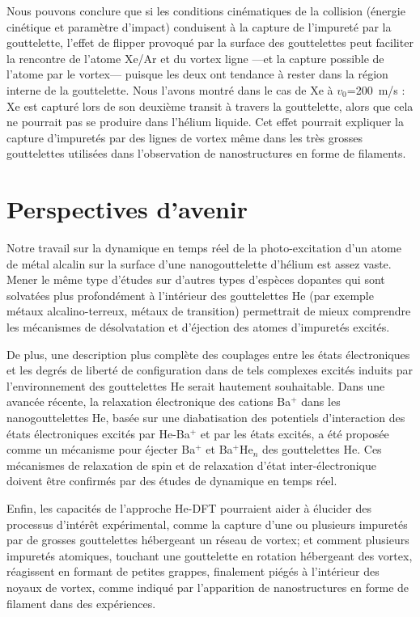 Nous pouvons conclure que si les conditions cinématiques de la collision (énergie cinétique et paramètre d'impact) conduisent à la capture de l'impureté par la gouttelette, l'effet de flipper provoqué par la surface des gouttelettes peut faciliter la rencontre de l'atome Xe/Ar et du vortex ligne ---et la capture possible de l'atome par le vortex--- puisque les deux ont tendance à rester dans la région interne de la gouttelette. Nous l'avons montré dans le cas de Xe à $v_0$=200~m/s : Xe est capturé lors de son deuxième transit à travers la gouttelette, alors que cela ne pourrait pas se produire dans l'hélium liquide\citep{Psh16}. Cet effet pourrait expliquer la capture d'impuretés par des lignes de vortex même dans les très grosses gouttelettes utilisées dans l'observation de nanostructures en forme de filaments.

	\section*{Perspectives d'avenir}
		Notre travail sur la dynamique en temps réel de la photo-excitation d'un atome de métal alcalin sur la surface d'une nanogouttelette d'hélium est assez vaste. Mener le même type d'études sur d'autres types d'espèces dopantes qui sont solvatées plus profondément à l'intérieur des gouttelettes He (par exemple métaux alcalino-terreux, métaux de transition) permettrait de mieux comprendre les mécanismes de désolvatation et d'éjection des atomes d'impuretés excités\citep{Loginov:2007,Loginov:2012,Kautsch:2013,Lindebner:2014}.
		
		De plus, une description plus complète des couplages entre les états électroniques et les degrés de liberté de configuration dans de tels complexes excités induits par l'environnement des gouttelettes He serait hautement souhaitable\citep{Closser:2014,Masson:2014}. Dans une avancée récente, la relaxation électronique des cations Ba$^+$ dans les nanogouttelettes He, basée sur une diabatisation des potentiels d'interaction des états électroniques excités par He-Ba$^+$ et par les états excités\citep{Vindel:2018}, a été proposée comme un mécanisme pour éjecter Ba$^+$ et {Ba$^+$He$_n$} des gouttelettes He. Ces mécanismes de relaxation de spin et de relaxation d'état inter-électronique doivent être confirmés par des études de dynamique en temps réel.
		
		Enfin, les capacités de l'approche He-DFT pourraient aider à élucider des processus d'intérêt expérimental, comme la capture d'une ou plusieurs impuretés par de grosses gouttelettes hébergeant un réseau de vortex; et comment plusieurs impuretés atomiques, touchant une gouttelette en rotation hébergeant des vortex, réagissent en formant de petites grappes, finalement piégés à l'intérieur des noyaux de vortex, comme indiqué par l'apparition de nanostructures en forme de filament dans des expériences.

